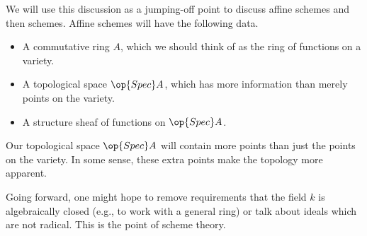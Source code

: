 \documentclass[../notes.tex]{subfiles}
\begin{document}
We will use this discussion as a jumping-off point to discuss affine schemes and then schemes. Affine schemes will have the following data.
\begin{itemize}
	\item A commutative ring $A$, which we should think of as the ring of functions on a variety.
	\item A topological space $\op{Spec}A$, which has more information than merely points on the variety.
	\item A structure sheaf of functions on $\op{Spec}A$.
\end{itemize}
\begin{remark}
	Our topological space $\op{Spec}A$ will contain more points than just the points on the variety. In some sense, these extra points make the topology more apparent.
\end{remark}
\begin{remark} \label{rem:wantmorealggeo}
	Going forward, one might hope to remove requirements that the field $k$ is algebraically closed (e.g., to work with a general ring) or talk about ideals which are not radical. This is the point of scheme theory.
\end{remark}
\end{document}
